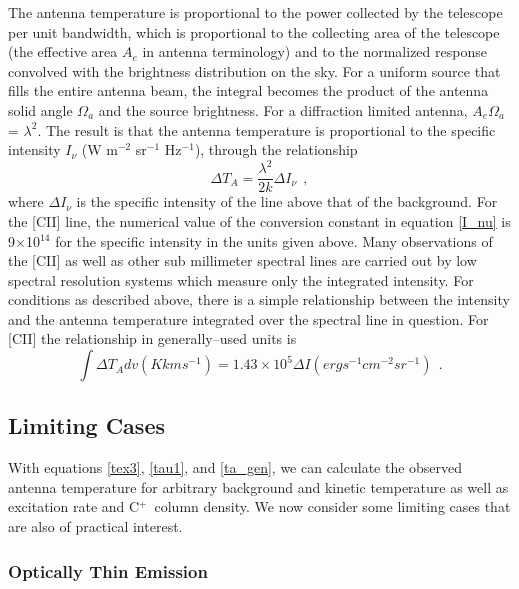 \documentclass[12pt]{aastex}
\def \lp{\>\> .}
\def \lc{\>\> ,}
\def \cp{C$^+$}
\def \C2{C{\sc II}}
\def \be{\begin{equation}}
\def \ee{   \end{equation}}
\def \lc{\>\> ,}
\def \lp{\>\> .}
\begin{document}
The antenna temperature is proportional to the power collected by the telescope per unit bandwidth, which is proportional to the collecting area of the telescope (the effective area $A_e$ in antenna terminology) and to the normalized response convolved with the brightness distribution on the sky.  
For a uniform source that fills the entire antenna beam, the integral becomes the product of the antenna solid angle $\Omega_a$ and the source brightness.  
For a diffraction limited antenna, $A_e \Omega_a$ = $\lambda^2$.   
The result is that the antenna temperature is proportional to the specific  intensity $I_{\nu}$ (W m$^{-2}$ sr$^{-1}$ Hz$^{-1}$), through the relationship
\be
\label{I_nu}
\Delta T_A = \frac{\lambda^2}{2k} \Delta I_{\nu} \lc
\ee
where $\Delta I_{\nu}$ is the specific intensity of the line above that of the background.
For the [\C2] line, the numerical value of the conversion constant in equation \ref{I_nu} is  9$\times$10$^{14}$   for the specific intensity in the units given above.
%
%
Many observations of the [CII] as well as other sub millimeter spectral lines are carried out by low spectral resolution systems which measure only the integrated intensity.  For conditions as described above, there is a simple relationship between the intensity and the antenna temperature integrated over the spectral line in question.  For [\C2] the relationship in generally--used units is
\be
\int \Delta T_A dv (K km s^{-1}) = 1.43\times 10^{5}\Delta I (erg s^{-1} cm^{-2} sr^{-1}) \lp
\label{ta_unresolved}
\ee


\subsection{\label{limiting}Limiting Cases}

With equations \ref{tex3}, \ref{tau1}, and \ref{ta_gen}, we can calculate the observed antenna temperature for arbitrary background and kinetic temperature as well as excitation rate and \cp\ column density.  We now consider some limiting cases that are also of practical interest.
\subsubsection{Optically Thin Emission} 
\label{thin_emis}
\end{document}
